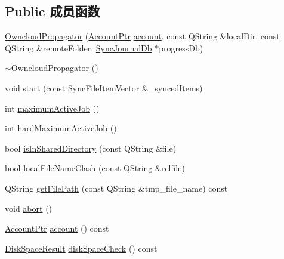 \subsection*{Public 成员函数}
\begin{DoxyCompactItemize}
\item 
\hyperlink{class_o_c_c_1_1_owncloud_propagator_a76d1b5d61995a2a2f5a886ede463d2da}{Owncloud\+Propagator} (\hyperlink{namespace_o_c_c_a848616aedb9188e223c6b9867757fe69}{Account\+Ptr} \hyperlink{class_o_c_c_1_1_owncloud_propagator_a1bb27ec3d83c2030eba874f0e07cb2d2}{account}, const Q\+String \&local\+Dir, const Q\+String \&remote\+Folder, \hyperlink{class_o_c_c_1_1_sync_journal_db}{Sync\+Journal\+Db} $\ast$progress\+Db)
\item 
\hyperlink{class_o_c_c_1_1_owncloud_propagator_a838d69319f20a48b445e4231faa71296}{$\sim$\+Owncloud\+Propagator} ()
\item 
void \hyperlink{class_o_c_c_1_1_owncloud_propagator_ab5d32d3f9452e6ff1aafd3e2868a5fa6}{start} (const \hyperlink{namespace_o_c_c_af407f0fdf0476e0bfce478be3d0e441e}{Sync\+File\+Item\+Vector} \&\+\_\+synced\+Items)
\item 
int \hyperlink{class_o_c_c_1_1_owncloud_propagator_af29504f51670252ebe0b6d5890e48378}{maximum\+Active\+Job} ()
\item 
int \hyperlink{class_o_c_c_1_1_owncloud_propagator_a584e31a3eaf4f38b49a50dc06ac17d1e}{hard\+Maximum\+Active\+Job} ()
\item 
bool \hyperlink{class_o_c_c_1_1_owncloud_propagator_aae9c81644e3b7a5633436c62abba92c3}{is\+In\+Shared\+Directory} (const Q\+String \&file)
\item 
bool \hyperlink{class_o_c_c_1_1_owncloud_propagator_a788e9ca335f086bca57798bf637cadb6}{local\+File\+Name\+Clash} (const Q\+String \&relfile)
\item 
Q\+String \hyperlink{class_o_c_c_1_1_owncloud_propagator_ae94f1cb02a462cab7fc47aad378b1d8e}{get\+File\+Path} (const Q\+String \&tmp\+\_\+file\+\_\+name) const
\item 
void \hyperlink{class_o_c_c_1_1_owncloud_propagator_ae7fa9ddba35fbae1f8fbcb54d1a6863a}{abort} ()
\item 
\hyperlink{namespace_o_c_c_a848616aedb9188e223c6b9867757fe69}{Account\+Ptr} \hyperlink{class_o_c_c_1_1_owncloud_propagator_a1bb27ec3d83c2030eba874f0e07cb2d2}{account} () const
\item 
\hyperlink{class_o_c_c_1_1_owncloud_propagator_ae2cce7b4bd60db44bf8e2b77a11e33be}{Disk\+Space\+Result} \hyperlink{class_o_c_c_1_1_owncloud_propagator_aeb9531d91dbde54327384fa14dc72ac9}{disk\+Space\+Check} () const
\end{DoxyCompactItemize}
